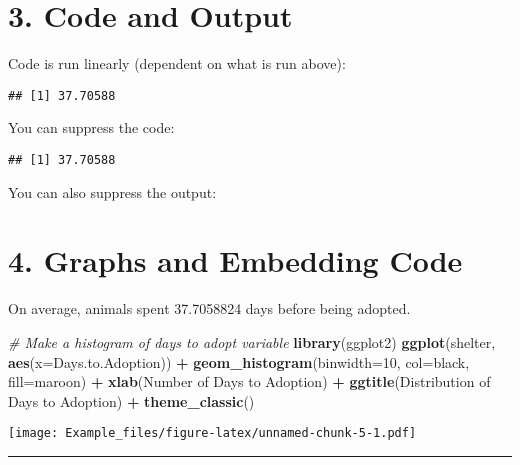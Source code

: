 \documentclass[
]{article}
\newenvironment{Shaded}{\begin{snugshade}}{\end{snugshade}}
\newcommand{\AttributeTok}[1]{\textcolor[rgb]{0.13,0.29,0.53}{#1}}
\newcommand{\CommentTok}[1]{\textcolor[rgb]{0.56,0.35,0.01}{\textit{#1}}}
\newcommand{\DecValTok}[1]{\textcolor[rgb]{0.00,0.00,0.81}{#1}}
\newcommand{\FunctionTok}[1]{\textcolor[rgb]{0.13,0.29,0.53}{\textbf{#1}}}
\newcommand{\NormalTok}[1]{#1}
\newcommand{\SpecialCharTok}[1]{\textcolor[rgb]{0.81,0.36,0.00}{\textbf{#1}}}
\newcommand{\StringTok}[1]{\textcolor[rgb]{0.31,0.60,0.02}{#1}}
\begin{document}
\section{\texorpdfstring{\textbf{3. Code and
Output}}{3. Code and Output}}\label{code-and-output}

Code is run linearly (dependent on what is run above):

\begin{Shaded}
\end{Shaded}

\begin{verbatim}
## [1] 37.70588
\end{verbatim}

You can suppress the code:

\begin{verbatim}
## [1] 37.70588
\end{verbatim}

You can also suppress the output:

\begin{Shaded}
\end{Shaded}

\section{\texorpdfstring{\textbf{4. Graphs and Embedding
Code}}{4. Graphs and Embedding Code}}\label{graphs-and-embedding-code}

On average, animals spent 37.7058824 days before being adopted.

\begin{Shaded}
\begin{Highlighting}[]
\CommentTok{\# Make a histogram of days to adopt variable}
\FunctionTok{library}\NormalTok{(ggplot2)}
\FunctionTok{ggplot}\NormalTok{(shelter, }\FunctionTok{aes}\NormalTok{(}\AttributeTok{x=}\NormalTok{Days.to.Adoption)) }\SpecialCharTok{+}  \FunctionTok{geom\_histogram}\NormalTok{(}\AttributeTok{binwidth=}\DecValTok{10}\NormalTok{, }\AttributeTok{col=}\StringTok{\textquotesingle{}black\textquotesingle{}}\NormalTok{, }\AttributeTok{fill=}\StringTok{\textquotesingle{}maroon\textquotesingle{}}\NormalTok{) }\SpecialCharTok{+} \FunctionTok{xlab}\NormalTok{(}\StringTok{\textquotesingle{}Number of Days to Adoption\textquotesingle{}}\NormalTok{) }\SpecialCharTok{+} \FunctionTok{ggtitle}\NormalTok{(}\StringTok{\textquotesingle{}Distribution of Days to Adoption\textquotesingle{}}\NormalTok{) }\SpecialCharTok{+} \FunctionTok{theme\_classic}\NormalTok{()}
\end{Highlighting}
\end{Shaded}

\texttt{[image: Example\_files/figure-latex/unnamed-chunk-5-1.pdf]}

\begin{center}\rule{0.5\linewidth}{0.5pt}\end{center}
\end{document}
